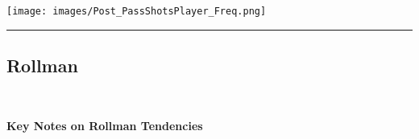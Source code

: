 \documentclass[a4paper,12pt]{article}
\begin{document}
\begin{table}[H]
{\begin{minipage}[t]{0.6\textwidth}
{\begin{tabular}
                
            
                
            
                
            
                
            
                
            
                
            
                
            
                
            
                
            
                
            
                
            
                
            
                
            
                
            

            \bottomrule
        \end{tabular}
        } %
    \end{minipage}
    } %
    \hfill %
    \begin{minipage}[c]{0.35\textwidth} %
        \flushright
        \texttt{[image: images/Post\_PassShotsPlayer\_Freq.png]} %
    \end{minipage}
\end{table}

\vspace{-1em} %
\hrule height 1pt width 1\textwidth %
\vspace{1em} %

\clearpage




\subsection{Rollman}\

\vspace{0.25em} %
\textbf{Key Notes on Rollman Tendencies}
\vspace{0.5em} %
\end{document}
